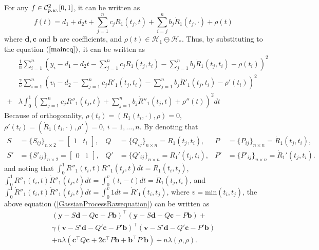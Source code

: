 For any $f  \in \mathcal{C}_{\footnotesize p.w.}^2[0,1]$, it can be written as 
\begin{equation}\label{GaussianProcessFunctionF}
f(t)=d_1+d_2t+\sum_{j=1}^{n}c_jR_1(t_j,t)+\sum_{i=j}^{n}b_j\dot{R}_1(t_j,\cdot) +\rho(t)
\end{equation}
where $\mathbf{d},\mathbf{c}$ and $\mathbf{b}$ are coefficients, and $\rho(t) \in \mathcal{H}_1 \ominus \mathcal{H}_*$. Thus, by substituting to the equation $(\ref{maineq})$, it can be written as 
\begin{equation}\label{GassianProcessRawequation}
\begin{split}
&\frac{1}{n}\sum_{i=1}^n \left( y_i - d_1-d_2t-\sum_{j=1}^{n}c_jR_1(t_j,t_i)-\sum_{j=1}^{n}b_j\dot{R}_1(t_j,t_i)-\rho(t_i) \right) ^2\\
&\frac{\gamma}{n}\sum_{i=1}^n \left( v_i - d_2-\sum_{j=1}^{n}c_jR'_1(t_j,t_i)-\sum_{j=1}^{n}b_j\dot{R}'_1(t_j,t_i)-\rho'(t_i) \right) ^2\\
+&\lambda \int_0^1 \left( \sum_{j=1}^{n}c_jR''_1(t_j,t)+\sum_{j=1}^{n}b_j\dot{R}''_1(t_j,t)+\rho''(t)\right)^2dt
\end{split}
\end{equation}
Because of orthogonality, $\rho(t_i) = (R_1(t_i,\cdot),\rho)=0$, $\rho'(t_i) = (\dot{R}_1(t_i,\cdot),\rho')=0$, $i=1,\ldots,n$. By denoting that 
\begin{align*}
S&=\{S_{ij} \}_{n\times 2}=\begin{bmatrix}1 & t_i \end{bmatrix} ,& Q&=\{Q_{ij} \}_{n\times n}= R_1(t_j,t_i), & P&=\{P_{ij} \}_{n\times n}= \dot{R}_1(t_j,t_i), \\
S'&=\{S'_{ij} \}_{n\times 2}=\begin{bmatrix} 0 & 1 \end{bmatrix} ,& Q'&=\{Q'_{ij} \}_{n\times n}= R_1'(t_j,t_i), & P'&=\{P'_{ij} \}_{n\times n}= \dot{R}_1'(t_j,t_i). 
\end{align*}
and noting that $\int_0^1R''_1(t_i,t)R''_1(t_j,t)dt=R_1(t_i,t_j)$, $\int_0^1R''_1(t_i,t)\dot{R}''_1(t_j,t)dt=\int_0^{v}(t_i-t)dt=\dot{R}_1(t_j,t_i)$, and $\int_0^1\dot{R}''_1(t_i,t)\dot{R}''_1(t_j,t)dt=\int_0^{v}1dt=\dot{R}'_1(t_i,t_j)$, where $v=\mbox{min}(t_i,t_j)$, the above equation (\ref{GassianProcessRawequation}) can be written as 
\begin{equation}\label{matriteq}
\begin{split}
(\mathbf{y}-S\mathbf{d}-Q\mathbf{c}-P\mathbf{b})^\top (\mathbf{y}-S\mathbf{d}-Q\mathbf{c}-P\mathbf{b})+\\
\gamma(\mathbf{v}-S'\mathbf{d}-Q'\mathbf{c}-P'\mathbf{b})^\top (\mathbf{v}-S'\mathbf{d}-Q'\mathbf{c}-P'\mathbf{b})\\
+n\lambda (\mathbf{c}^\top Q\mathbf{c} + 2\mathbf{c}^\top P\mathbf{b}+ \mathbf{b}^\top P'\mathbf{b})+n\lambda(\rho,\rho).
\end{split}
\end{equation}
